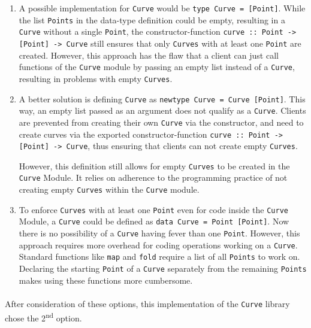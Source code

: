 \documentclass[11pt, a4paper]{article}
\begin{document}
\begin{enumerate}
	
\item A possible implementation for \texttt{Curve} would be \texttt{type Curve = [Point]}. While the list \texttt{Points} in the data-type definition could be empty, resulting in a \texttt{Curve} without a single \texttt{Point}, the constructor-function \texttt{curve :: Point -> [Point] -> Curve} still ensures that only \texttt{Curves} with at least one \texttt{Point} are created. However, this approach has the flaw that a client can just call functions of the \texttt{Curve} module by passing an empty list instead of a \texttt{Curve}, resulting in problems with empty \texttt{Curves}. 

\item A better solution is defining \texttt{Curve} as \texttt{newtype Curve = Curve [Point]}. This way, an empty list passed as an argument does not qualify as a \texttt{Curve}. Clients are prevented from creating their own \texttt{Curve} via the constructor, and need to create curves via the exported constructor-function \texttt{curve :: Point -> [Point] -> Curve}, thus ensuring that clients can not create empty \texttt{Curves}.

However, this definition still allows for empty \texttt{Curves} to be created in the \texttt{Curve} Module. It relies on adherence to the programming practice of not  creating empty \texttt{Curves} within the \texttt{Curve} module. 

\item 

To enforce \texttt{Curves} with at least one \texttt{Point} even for code inside the \texttt{Curve} Module, a \texttt{Curve} could be defined as \texttt{data Curve = Point [Point]}. Now there is no possibility of a \texttt{Curve} having fever than one \texttt{Point}. However, this approach requires more overhead for coding operations working on a \texttt{Curve}. Standard functions like \texttt{map} and \texttt{fold} require a list of all \texttt{Points} to work on. Declaring the starting \texttt{Point} of a \texttt{Curve} separately from the remaining \texttt{Points} makes using these functions more cumbersome.

\end{enumerate}

\paragraph{}
After consideration of these options, this implementation of the \texttt{Curve} library chose the 2\textsuperscript{nd} option.
\end{document}
